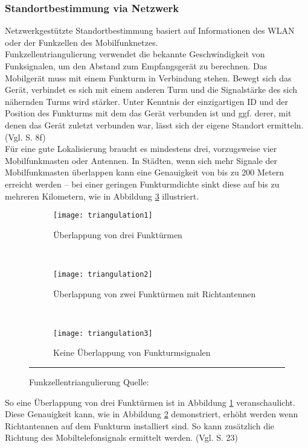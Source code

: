 \subsubsection{Standortbestimmung via Netzwerk}
Netzwerkgestützte Standortbestimmung basiert auf Informationen des \gls{WLAN} oder der Funkzellen des Mobilfunknetzes.\\ 
Funkzellentriangulierung verwendet die bekannte Geschwindigkeit von Funksignalen, um den Abstand zum Empfangsgerät zu berechnen. Das Mobilgerät muss mit einem Funkturm in Verbindung stehen. Bewegt sich das Gerät, verbindet es sich mit einem anderen Turm und die Signalstärke des sich nähernden Turms wird stärker. Unter Kenntnis der einzigartigen ID und der Position des Funkturms mit dem das Gerät verbunden ist und ggf. derer, mit denen das Gerät zuletzt verbunden war, lässt sich der eigene Standort ermitteln. (Vgl. \cite{location} S. 8f) \\
Für eine gute Lokalisierung braucht es mindestens drei, vorzugsweise vier Mobilfunkmasten oder Antennen. In Städten, wenn sich mehr Signale der Mobilfunkmasten überlappen kann eine Genauigkeit von bis zu 200 Metern erreicht werden -- bei einer geringen Funkturmdichte sinkt diese auf bis zu mehreren Kilometern, wie in Abbildung \ref{fig:cell3} illustriert. 
\begin{figure}[H]
        \centering
        \begin{subfigure}[t]{0.23\textwidth}
                \texttt{[image: triangulation1]}
                \caption{Überlappung von drei Funktürmen}
                \label{fig:cell1}
        \end{subfigure}
        ~ 
        \begin{subfigure}[t]{0.23\textwidth}
                \texttt{[image: triangulation2]}
                \caption{Überlappung von zwei Funktürmen mit Richtantennen}
                \label{fig:cell2}
        \end{subfigure}
         ~ 
        \begin{subfigure}[t]{0.23\textwidth}
                \texttt{[image: triangulation3]}
                \caption{Keine Überlappung von Funkturmsignalen}
                \label{fig:cell3}
        \end{subfigure}
        \rule{35em}{0.5pt}
        \caption[Funkzellentriangulierung]{Funkzellentriangulierung Quelle: \cite{fig:cell}}
        \label{fig:cell}
\end{figure}
So eine Überlappung von drei Funktürmen ist in Abbildung \ref{fig:cell1} veranschaulicht. Diese Genauigkeit kann, wie in Abbildung \ref{fig:cell2} demonstriert, erhöht werden wenn Richtantennen auf dem Funkturm installiert sind. So kann zusätzlich die Richtung des Mobiltelefonsignals ermittelt werden. (Vgl. \cite{gps} S. 23) \\\\
